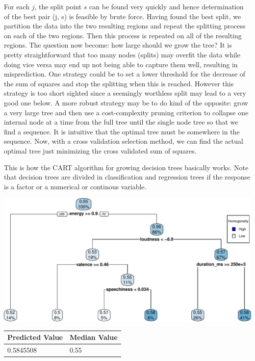 \documentclass[
]{article}
\begin{document}
For each \(j\), the split point \(s\) can be found very quickly and
hence determination of the best pair (j, s) is feasible by brute force.
Having found the best split, we partition the data into the two
resulting regions and repeat the splitting process on each of the two
regions. Then this process is repeated on all of the resulting regions.
The question now become: how large should we grow the tree? It is pretty
straightforward that too many nodes (splits) may overfit the data while
doing vice versa may end up not being able to capture them well,
resulting in misprediction. One strategy could be to set a lower
threshold for the decrease of the sum of squares and stop the splitting
when this is reached. However this strategy is too short sighted since a
seemingly worthless split may lead to a very good one below. A more
robust strategy may be to do kind of the opposite: grow a very large
tree and then use a cost-complexity pruning criterion to collapse one
internal node at a time from the full tree until the single node tree so
that we find a sequence. It is intuitive that the optimal tree must be
somewhere in the sequence. Now, with a cross validation selection
method, we can find the actual optimal tree just minimizing the cross
validated sum of squares.

This is how the CART algorithm for growing decision trees basically
works. Note that decision trees are divided in classification and
regression trees if the response is a factor or a numerical or continous
variable.

\includegraphics{Final_project_Bottino_Poetto_Spagliardi_files/figure-latex/unnamed-chunk-5-1.pdf}

\begin{longtable}[]{@{}ll@{}}
\toprule()
Predicted Value & Median Value \\
\midrule()
\endhead
0.5845508 & 0.55 \\
\bottomrule()
\end{longtable}
\end{document}
